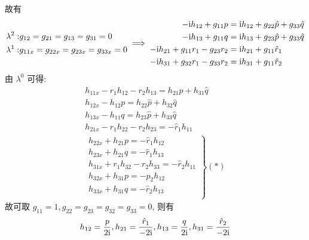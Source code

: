 故有
\begin{equation}
    \begin{aligned}
        \lambda^{2}:& g_{12} = g_{21} = g_{13} = g_{31} = 0 \\
        \lambda^{1}:& g_{11x} = g_{22x} = g_{23x} = g_{33x} = 0
    \end{aligned}
    \implies
    \begin{aligned}
        - \mathrm{i} h_{12} + g_{11}p &= \mathrm{i} h_{12} + g_{22}\hat{p} + g_{33}\hat{q} \\
        - \mathrm{i} h_{13} + g_{11}q &= \mathrm{i} h_{13} + g_{23}\hat{p} + g_{33}\hat{q} \\
        - \mathrm{i} h_{21} + g_{11}r_{1} - g_{23}r_{2} &= \mathrm{i} h_{21} + g_{11}\hat{r}_{1} \\
        - \mathrm{i} h_{31} + g_{32}r_{1} - g_{33}r_{2} &= \mathrm{i} h_{31} + g_{11}\hat{r}_{2} \\
    \end{aligned}
\end{equation}
由 $ \lambda^{0} $ 可得: 
\begin{equation}
    \begin{aligned}
        h_{11x} - r_{1}h_{12} - r_{2}h_{13} = h_{21}\hat{p} + h_{31}\hat{q} \\
        h_{12x} - h_{12}p  = h_{22}\hat{p} + h_{32}\hat{q} \\
        h_{13x} - h_{11}q  = h_{23}\hat{p} + h_{33}\hat{q} \\
        h_{21x} - r_{1}h_{22} - r_{2}h_{23} = -\hat{r}_{1}h_{11} \\
        \left.
            \begin{aligned}
            h_{22x} + h_{21}p = -\hat{r}_{1} h_{12} \\
            h_{23x} + h_{21}q = -\hat{r}_{1} h_{13} \\
            h_{31x} + r_{1}h_{32} - r_{2}h_{33} = -\hat{r}_{2} h_{11} \\
            h_{32x} + h_{31}p = -p_{2} h_{12} \\
            h_{33x} + h_{31}q = -\hat{r}_{2} h_{13} \\
        \end{aligned}
        \right\} (*)
    \end{aligned}
\end{equation}
故可取 $ g_{11} = 1, g_{22} = g_{23} = g_{32} = g_{33} = 0 $, 则有
\begin{equation}
  h_{12} = \frac{p}{2\mathrm{i}}, h_{21} = \frac{\hat{r}_{1}}{-2\mathrm{i}}, h_{13} = \frac{q}{2\mathrm{i}}, h_{31} = \frac{\hat{r}_{2}}{-2\mathrm{i}}
\end{equation} 
